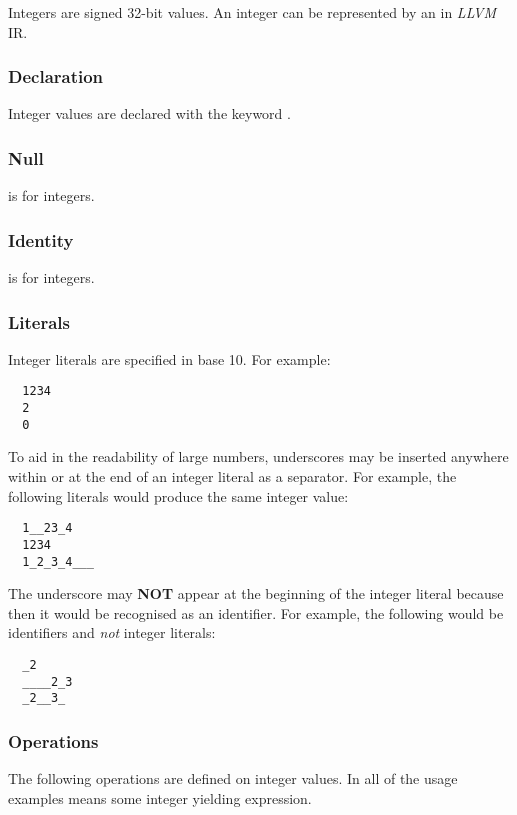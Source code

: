 \documentclass[../gazprea.tex]{subfiles}
\begin{document}
Integers are signed 32-bit values. An integer can be represented by an  in \textit{LLVM}
IR.

\subsubsection{Declaration}
\label{sssec:integer_decl}
Integer values are declared with the keyword .

\subsubsection{Null}
\label{sssec:integer_null}
 is  for integers.

\subsubsection{Identity}
\label{sssec:integer_ident}
 is  for integers.

\subsubsection{Literals}
\label{sssec:int_lit}
Integer literals are specified in base 10. For example:
\begin{lstlisting}
  1234
  2
  0
\end{lstlisting}

To aid in the readability of large numbers, underscores may be inserted anywhere within or at the
end of an integer literal as a separator. For example, the following literals would produce the same
integer value:
\begin{lstlisting}
  1__23_4
  1234
  1_2_3_4___
\end{lstlisting}

The underscore may \textbf{NOT} appear at the beginning of the integer literal because then it would
be recognised as an identifier. For example, the following would be identifiers and \textit{not}
integer literals:
\begin{lstlisting}
  _2
  ____2_3
  _2__3_
\end{lstlisting}

\subsubsection{Operations}
The following operations are defined on integer values. In all of the usage examples 
means some integer yielding expression.
\end{document}
